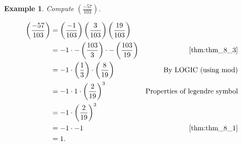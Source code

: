 \documentclass[11pt,letter]{article}
\newcommand{\legendre}[2]{\ensuremath{\left( \frac{#1}{#2} \right) }}
\newcommand{\2}{\{0, 1\}}
\newcommand{\1}{\mathds{1}}
\newcounter{nLectures}
\newcounter{nTheorems}[nLectures]
\theoremstyle{definition}
\newtheorem{example}[nTheorems]{Example}
\begin{document}
\begin{example}
    \textit{Compute $\legendre{-57}{103}$.}
    
    \begin{align*}
        \legendre{-57}{103}&=\legendre{-1}{103}\legendre{3}{103}\legendre{19}{103} \\
        &=-1\cdot -\legendre{103}{3}\cdot-\legendre{103}{19} &\ref{thm:thm_8_3}\\
        &=-1\cdot\legendre{1}{3}\cdot\legendre{8}{19} &\text{ By LOGIC (using mod)}\\
        &=-1\cdot 1\cdot \legendre{2}{19}^3 &\text{Properties of legendre symbol}\\
        &=-1\cdot \legendre{2}{19}^3 \\
        &=-1\cdot -1  & \ref{thm:thm_8_1} \\
        &=1.\\
    \end{align*}
    
\end{example}
\end{document}
